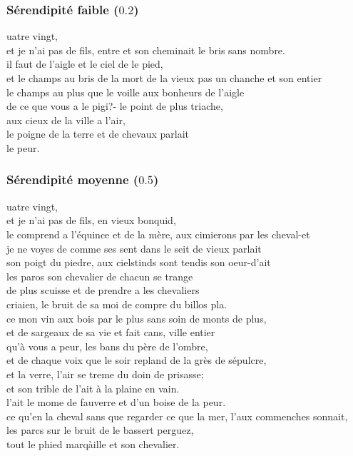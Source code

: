 \documentclass{article}
\begin{document}
			\subsubsection{Sérendipité faible ($0.2$)}
				uatre vingt,\\
				et je n'ai pas de fils, entre et son cheminait le bris sans nombre.\\
				il faut de l'aigle et le ciel de le pied,\\
				et le champs au bris de la mort de la vieux pas un chanche et son entier\\
				le champs au plus que le voille aux bonheurs de l'aigle\\
				de ce que vous a le pigi?- le point de plus triache,\\
				aux cieux de la ville a l'air,\\
				le poigne de la terre et de chevaux parlait\\
				le peur.\\
			\subsubsection{Sérendipité moyenne ($0.5$)}
				uatre vingt,\\
				et je n'ai pas de fils, en vieux bonquid,\\
				le comprend a l'équince et de la mère, aux cimierons par les cheval-et\\
				je ne voyes de comme ses sent dans le seit de vieux parlait\\
				son poigt du piedre, aux cielstinds sont tendis son oeur-d'ait\\
				les paros son chevalier de chacun se trange\\
				de plus scuisse et de prendre a les chevaliers\\
				criaien, le bruit de sa moi de compre du billos pla.\\
				ce mon vin aux bois par le plus sans soin de monts de plus,\\
				et de sargeaux de sa vie et fait cans, ville entier\\
				qu'à vous a peur, les bans du père de l'ombre,\\
				et de chaque voix que le soir repland de la grès de sépulcre,\\
				et la verre, l'air se treme du doin de prisasse;\\
				et son trible de l'ait à la plaine en vain.\\
				l'ait le mome de fauverre et d'un boise de la peur.\\
				ce qu'en la cheval sans que regarder ce que la mer, l'aux commenches sonnait,\\
				les parcs sur le bruit de le bassert perguez,\\
				tout le phied marqàille et son chevalier.\\
				
\end{document}
